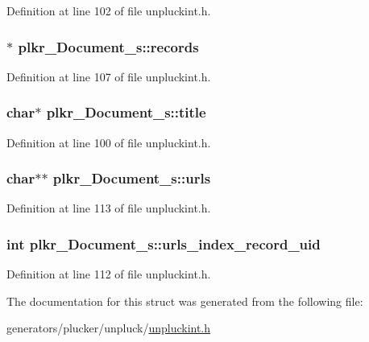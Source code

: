 Definition at line 102 of file unpluckint.\+h.

\hypertarget{structplkr__Document__s_a5cebe36965c1e730ac63af3a075df34a}{
\subsubsection[{records}]{$\ast$ plkr\+\_\+\+Document\+\_\+s\+::records}}\label{structplkr__Document__s_a5cebe36965c1e730ac63af3a075df34a}


Definition at line 107 of file unpluckint.\+h.

\hypertarget{structplkr__Document__s_ab71be4337a9081768a49c7a0849469c7}{
\subsubsection[{title}]{\setlength{\rightskip}{0pt plus 5cm}char$\ast$ plkr\+\_\+\+Document\+\_\+s\+::title}}\label{structplkr__Document__s_ab71be4337a9081768a49c7a0849469c7}


Definition at line 100 of file unpluckint.\+h.

\hypertarget{structplkr__Document__s_a5ada88486c1d6db75aafd17b23fe17db}{
\subsubsection[{urls}]{\setlength{\rightskip}{0pt plus 5cm}char$\ast$$\ast$ plkr\+\_\+\+Document\+\_\+s\+::urls}}\label{structplkr__Document__s_a5ada88486c1d6db75aafd17b23fe17db}


Definition at line 113 of file unpluckint.\+h.

\hypertarget{structplkr__Document__s_af14f8f1e3c2eea6814bc94aff2ec428c}{
\subsubsection[{urls\+\_\+index\+\_\+record\+\_\+uid}]{\setlength{\rightskip}{0pt plus 5cm}int plkr\+\_\+\+Document\+\_\+s\+::urls\+\_\+index\+\_\+record\+\_\+uid}}\label{structplkr__Document__s_af14f8f1e3c2eea6814bc94aff2ec428c}


Definition at line 112 of file unpluckint.\+h.



The documentation for this struct was generated from the following file\+:\begin{DoxyCompactItemize}
\item 
generators/plucker/unpluck/\hyperlink{unpluckint_8h}{unpluckint.\+h}\end{DoxyCompactItemize}
